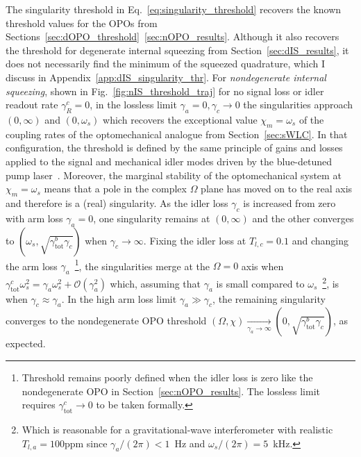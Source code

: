 The singularity threshold in Eq.~\ref{eq:singularity_threshold} recovers the known threshold values for the OPOs from Sections~\ref{sec:dOPO_threshold}~\ref{sec:nOPO_results}. Although it also recovers the threshold for degenerate internal squeezing from Section~\ref{sec:dIS_results}, it does not necessarily find the minimum of the squeezed quadrature, which I discuss in Appendix~\ref{app:dIS_singularity_thr}.
For \emph{nondegenerate internal squeezing}, shown in Fig.~\ref{fig:nIS_threshold_traj} for no signal loss or idler readout rate $\gamma^c_R=0$, in the lossless limit $\gamma_a=0,\gamma_c\rightarrow0$ the singularities approach $(0,\infty)$ and $(0,\omega_s)$ which recovers the exceptional value $\chi_m=\omega_s$ of the coupling rates of the optomechanical analogue from Section~\ref{sec:sWLC}. In that configuration, the threshold is defined by the same principle of gains and losses applied to the signal and mechanical idler modes driven by the blue-detuned pump laser~\cite{}. Moreover, the marginal stability of the optomechanical system at $\chi_m=\omega_s$ means that a pole in the complex $\Omega$ plane has moved on to the real axis and therefore is a (real) singularity. As the idler loss $\gamma_c$ is increased from zero with arm loss $\gamma_a=0$, one singularity remains at $(0,\infty)$ and the other converges to $(\omega_s,\sqrt{\gamma^b_\text{tot}\gamma_c})$ when $\gamma_c\rightarrow\infty$. Fixing the idler loss at $T_{l,c}=0.1$ and changing the arm loss $\gamma_a$~\footnote{Threshold remains poorly defined when the idler loss is zero like the nondegenerate OPO in Section~\ref{sec:nOPO_results}. The lossless limit requires $\gamma^c_\text{tot}\rightarrow0$ to be taken formally.}, the singularities merge at the $\Omega=0$ axis when $\gamma^c_\text{tot}\omega_s^2=\gamma_a\omega_s^2+\mathcal{O}(\gamma_a^2)$ which, assuming that $\gamma_a$ is small compared to $\omega_s$~\footnote{Which is reasonable for a gravitational-wave interferometer with realistic $T_{l,a}=100\text{ppm}$ since $\gamma_a/(2\pi)<1$~Hz and $\omega_s/(2\pi)=5$~kHz.}, is when $\gamma_c\approx\gamma_a$. In the high arm loss limit $\gamma_a\gg\gamma_c$, the remaining singularity converges to the nondegenerate OPO threshold $(\Omega,\chi)\xrightarrow[\gamma_a\rightarrow\infty]{}(0,\sqrt{\gamma^b_\mathrm{tot}\gamma_c})$, as expected.

